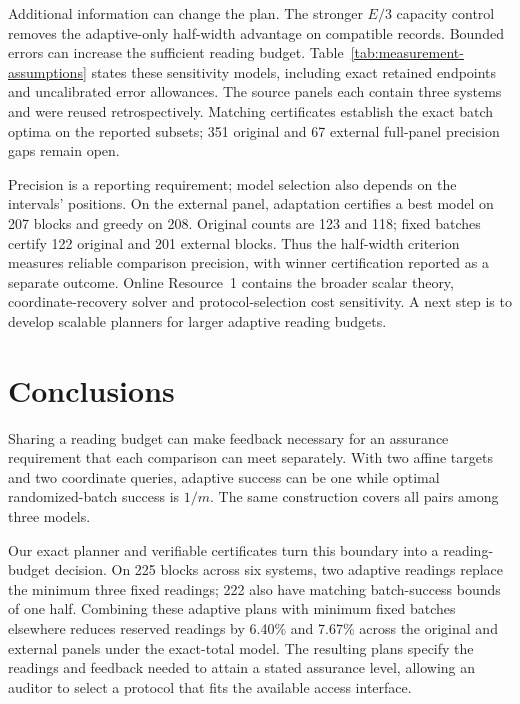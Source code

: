 \documentclass[12pt]{article}
\begin{document}
Additional information can change the plan. The stronger $E/3$ capacity
control removes the adaptive-only half-width advantage on compatible
records. Bounded errors can increase the sufficient reading budget.
Table~\ref{tab:measurement-assumptions} states these sensitivity models,
including exact retained endpoints and uncalibrated error allowances.
The source panels each contain three systems and were reused retrospectively.
Matching certificates establish the exact batch optima on the reported
subsets; 351 original and 67 external full-panel precision gaps remain open.

Precision is a reporting requirement; model selection also depends on the
intervals' positions. On the external panel, adaptation certifies a best
model on 207 blocks and greedy on 208. Original counts are 123 and 118;
fixed batches certify 122 original and 201 external blocks. Thus the
half-width criterion measures reliable comparison precision, with winner
certification reported as a separate outcome. Online Resource~1 contains the
broader scalar theory, coordinate-recovery solver and protocol-selection
cost sensitivity. A next step is to develop scalable planners for larger
adaptive reading budgets.

\section{Conclusions}
Sharing a reading budget can make feedback necessary for an assurance
requirement that each comparison can meet separately. With two affine
targets and two coordinate queries, adaptive success can be one while
optimal randomized-batch success is $1/m$. The same construction covers
all pairs among three models.

Our exact planner and verifiable certificates turn this boundary into a
reading-budget decision. On 225 blocks across six systems, two adaptive
readings replace the minimum three fixed readings; 222 also have matching
batch-success bounds of one half. Combining these adaptive plans with
minimum fixed batches elsewhere reduces reserved readings by 6.40\% and
7.67\% across the original and external panels under the exact-total model.
The resulting plans specify the readings and feedback needed to attain a
stated assurance level, allowing an auditor to select a protocol that fits
the available access interface.
\end{document}
